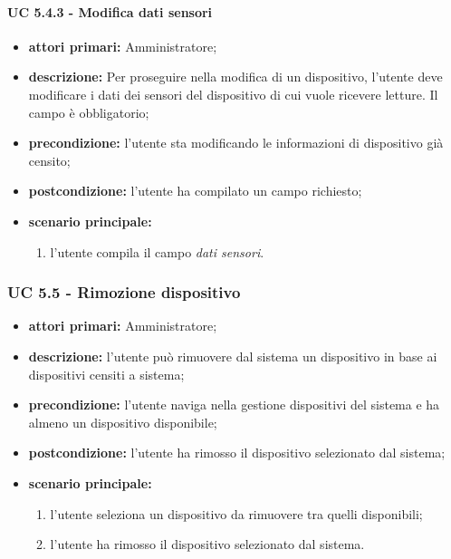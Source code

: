 				\paragraph{UC 5.4.3 - Modifica dati sensori}
				\begin{itemize}
					\item \textbf{attori primari:} Amministratore;
					\item \textbf{descrizione:} Per proseguire nella modifica di un dispositivo, l'utente deve modificare i dati dei sensori del dispositivo di cui vuole ricevere letture. Il campo è obbligatorio;
					\item \textbf{precondizione:} l'utente sta modificando le informazioni di dispositivo già censito;
					\item \textbf{postcondizione:} l'utente ha compilato un campo richiesto;
					\item \textbf{scenario principale:}
					\begin{enumerate}
						\item{l'utente compila il campo \textit{dati sensori}.}
					\end{enumerate}
				\end{itemize}
			
			\subsubsection{UC 5.5 - Rimozione dispositivo}
			\begin{itemize}
				\item \textbf{attori primari:} Amministratore;
				\item \textbf{descrizione:} l'utente può rimuovere dal sistema un dispositivo in base ai dispositivi censiti a sistema;
				\item \textbf{precondizione:} l'utente naviga nella gestione dispositivi del sistema e ha almeno un dispositivo disponibile;
				\item \textbf{postcondizione:} l'utente ha rimosso il dispositivo selezionato dal sistema;
				\item \textbf{scenario principale:}
				\begin{enumerate}
					\item{l'utente seleziona un dispositivo da rimuovere tra quelli disponibili;}
					\item{l'utente ha rimosso il dispositivo selezionato dal sistema.}
				\end{enumerate}
			\end{itemize}
			
